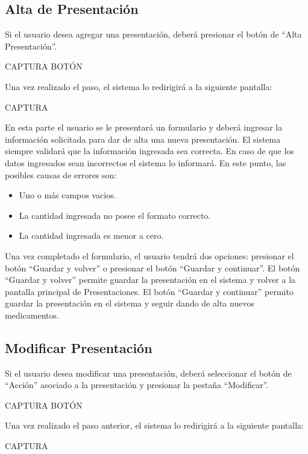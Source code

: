 \documentclass[letterpaper,10pt,spanish]{sphinxmanual}
\begin{document}
\subsection{Alta de Presentación}
\label{presentaciones:alta-de-presentacion}
Si el usuario desea agregar una presentación, deberá presionar el botón de “Alta Presentación”.

CAPTURA BOTÓN

Una vez realizado el paso, el sistema lo redirigirá a la siguiente pantalla:

CAPTURA

En esta parte el usuario se le presentará un formulario y deberá ingresar la información solicitada para dar de alta una nueva presentación.
El sistema siempre validará que la información ingresada sea correcta. En caso de que los datos ingresados sean incorrectos el sistema lo informará.
En este punto, las posibles causas de errores son:
\begin{itemize}
\item {} 
Uno o más campos vacios.

\item {} 
La cantidad ingresada no posee el formato correcto.

\item {} 
La cantidad ingresada es menor a cero.

\end{itemize}

Una vez completado el formulario, el usuario tendrá dos opciones: presionar el botón “Guardar y volver” o presionar el botón “Guardar y continuar”.
El botón “Guardar y volver” permite guardar la presentación en el sistema y volver a la pantalla principal de Presentaciones.
El botón “Guardar y continuar” permito guardar la presentación en el sistema y seguir dando de alta nuevos medicamentos.


\subsection{Modificar Presentación}
\label{presentaciones:modificar-presentacion}
Si el usuario desea modificar una presentación, deberá seleccionar el botón de “Acción” asociado a la presentación y presionar la pestaña “Modificar”.

CAPTURA BOTÓN

Una vez realizado el paso anterior, el sistema lo redirigirá a la siguiente pantalla:

CAPTURA
\end{document}
